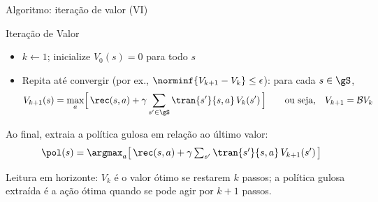\documentclass[aspectratio=169, 11pt]{beamer}
\newcommand{\Bop}{\mathcal{B}}                 %
\begin{document}
\begin{frame}{Algoritmo: iteração de valor (VI)}
  \begin{algbox}{Iteração de Valor}
    \begin{itemize}\setlength{\itemsep}{0.25ex}
      \item $k \leftarrow 1$; inicialize $V_0(s) = 0$ para todo $s$
      \item Repita até convergir (por ex., $\norminf{V_{k+1} - V_k} \le \epsilon$):
            para cada $s \in \gS$,
        \[
          V_{k+1}(s) = \max_{a} \Bigl[\, \rec(s,a) + \gamma \sum_{s' \in \gS} \tran{s'}{s,a}\, V_k(s') \,\Bigr]
          \qquad \text{ou seja,} \quad V_{k+1} = \Bop V_k
        \]
    \end{itemize}
  \end{algbox}
  \vspace{-0.4em}
  {\small Ao final, extraia a política \alert{gulosa} em relação ao último valor:}
  \vspace{-0.3em}
  \[
    \textstyle \pol(s) = \argmax_{a} \bigl[\, \rec(s,a) + \gamma \sum_{s'} \tran{s'}{s,a}\, V_{k+1}(s') \,\bigr]
  \]
  \vspace{-1.0em}
  \begin{ideiabox}
    Leitura em horizonte: $V_k$ é o valor ótimo se restarem $k$ passos; a política gulosa
    extraída é a ação ótima quando se pode agir por $k+1$ passos.
  \end{ideiabox}
\end{frame}
\end{document}
